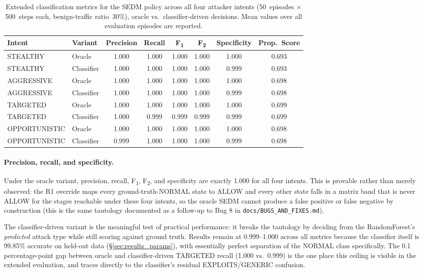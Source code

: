 \begin{table}[ht]
  \centering
  \caption{Extended classification metrics for the SEDM policy across all
           four attacker intents (50~episodes $\times$ 500~steps each,
           benign-traffic ratio~30\%), oracle vs.\ classifier-driven decisions.
           Mean values over all evaluation episodes are reported.}
  \label{tab:sedm_extended_metrics}
  \begin{tabular}{llcccccc}
    \toprule
    Intent & Variant & Precision & Recall & F\textsubscript{1} & F\textsubscript{2} & Specificity & Prop.\ Score \\
    \midrule
    STEALTHY      & Oracle     & 1.000 & 1.000 & 1.000 & 1.000 & 1.000 & 0.693 \\
    STEALTHY      & Classifier & 1.000 & 1.000 & 1.000 & 1.000 & 0.999 & 0.693 \\
    AGGRESSIVE    & Oracle     & 1.000 & 1.000 & 1.000 & 1.000 & 1.000 & 0.698 \\
    AGGRESSIVE    & Classifier & 1.000 & 1.000 & 1.000 & 1.000 & 0.999 & 0.698 \\
    TARGETED      & Oracle     & 1.000 & 1.000 & 1.000 & 1.000 & 1.000 & 0.699 \\
    TARGETED      & Classifier & 1.000 & 0.999 & 0.999 & 0.999 & 0.999 & 0.699 \\
    OPPORTUNISTIC & Oracle     & 1.000 & 1.000 & 1.000 & 1.000 & 1.000 & 0.698 \\
    OPPORTUNISTIC & Classifier & 0.999 & 1.000 & 1.000 & 1.000 & 0.999 & 0.698 \\
    \bottomrule
  \end{tabular}
\end{table}

\paragraph{Precision, recall, and specificity.}
Under the oracle variant, precision, recall, F\textsubscript{1}, F\textsubscript{2}, and
specificity are exactly 1.000 for all four intents. This is provable rather
than merely observed: the R1 override maps every ground-truth-NORMAL state
to ALLOW and every other state falls in a matrix band that is never ALLOW
for the stages reachable under these four intents, so the oracle SEDM cannot
produce a false positive or false negative by construction (this is the
same tautology documented as a follow-up to Bug 8 in
\texttt{docs/BUGS\_AND\_FIXES.md}).

The classifier-driven variant is the meaningful test of practical
performance: it breaks the tautology by deciding from the RandomForest's
\emph{predicted} attack type while still scoring against ground truth.
Results remain at 0.999--1.000 across all metrics because the classifier
itself is 99.85\% accurate on held-out data (\S\ref{sec:results_params}),
with essentially perfect separation of the NORMAL class specifically. The
0.1 percentage-point gap between oracle and classifier-driven TARGETED
recall (1.000 vs.\ 0.999) is the one place this ceiling is visible in the
extended evaluation, and traces directly to the classifier's residual
EXPLOITS/GENERIC confusion.

